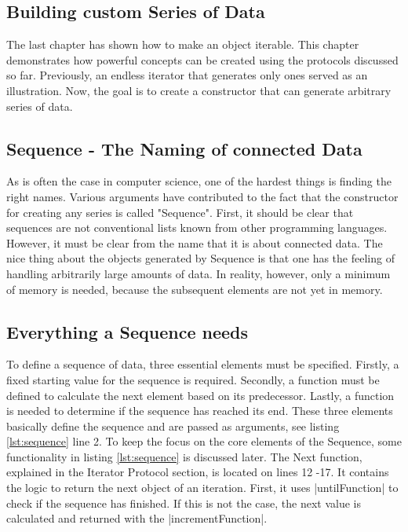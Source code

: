 \subsection{Building custom Series of Data}
The last chapter has shown how to make an object iterable. This chapter 
demonstrates how powerful concepts can be created using the protocols 
discussed so far. Previously, an endless iterator that generates only ones 
served as an illustration. Now, the goal is to create a constructor that can 
generate arbitrary series of data.

\subsection{Sequence - The Naming of connected Data}
As is often the case in computer science, one of the hardest things is finding 
the right names. Various arguments have contributed to the fact that the 
constructor for creating any series is called "Sequence". First, it should be 
clear that sequences are not conventional lists known from other programming 
languages. However, it must be clear from the name that it is about connected 
data. The nice thing about the objects generated by Sequence is that one has 
the feeling of handling arbitrarily large amounts of data. In reality, however, 
only a minimum of memory is needed, because the subsequent elements are not yet 
in memory.

\subsection{Everything a Sequence needs}
To define a sequence of data, three essential elements must be specified. 
Firstly, a fixed starting value for the sequence is required. Secondly, a 
function must be defined to calculate the next element based on its predecessor. 
Lastly, a function is needed to determine if the sequence has reached its end.
These three elements basically define the sequence and are passed as arguments, 
see listing \ref{lst:sequence} line 2.
To keep the focus on the core elements of the Sequence, some functionality in 
listing \ref{lst:sequence} is discussed later. The Next function, explained in 
the Iterator Protocol section, is located on lines 12 -17. It contains the 
logic to return the next object of an iteration. First, it uses |untilFunction| 
to check if the sequence has finished. If this is not the case, the next value 
is calculated and returned with the |incrementFunction|.

